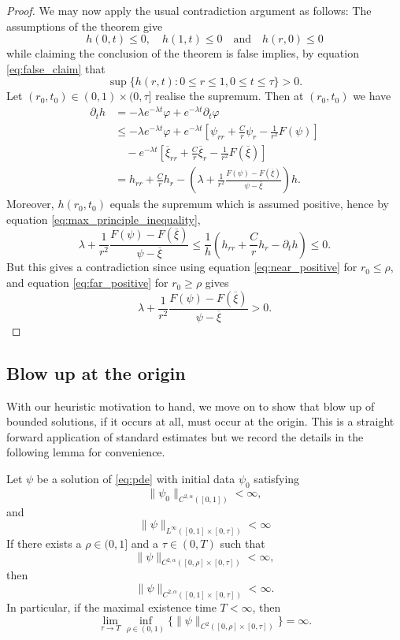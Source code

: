 \documentclass{amsart}
\begin{document}
\begin{proof}
We may now apply the usual contradiction argument as follows: The assumptions of the theorem give
\[
h(0, t) \leq 0, \quad h(1, t) \leq 0 \quad \text{and} \quad h(r, 0) \leq 0
\]
while claiming the conclusion of the theorem is false implies, by equation \eqref{eq:false_claim} that
\[
\sup \{h(r, t) : 0 \leq r \leq 1, 0 \leq t \leq \tau\} > 0.
\]
Let \((r_0, t_0) \in (0, 1) \times (0, \tau]\) realise the supremum. Then at \((r_0, t_0)\) we have
\begin{equation}
\label{eq:max_principle_inequality}
\begin{split}
\partial_t h &= - \lambda e^{-\lambda t} \varphi + e^{-\lambda t} \partial_t \varphi \\
&\leq  -\lambda e^{-\lambda t} \varphi + e^{-\lambda t} \left[\psi_{rr} + \frac{C}{r} \psi_r - \frac{1}{r^2} F(\psi)\right] \\
&\quad - e^{-\lambda t}\left[\overline{\xi}_{rr} + \frac{C}{r} \overline{\xi}_r - \frac{1}{r^2} F(\overline{\xi})\right] \\
&= h_{rr} + \frac{C}{r} h_r - \left(\lambda + \frac{1}{r^2} \frac{F(\psi) - F(\overline{\xi})}{\psi - \overline{\xi}}\right) h.
\end{split}
\end{equation}
Moreover, \(h(r_0, t_0)\) equals the supremum which is assumed positive, hence by equation \eqref{eq:max_principle_inequality},
\[
\lambda + \frac{1}{r^2} \frac{F(\psi) - F(\overline{\xi})}{\psi - \overline{\xi}} \leq \frac{1}{h} \left(h_{rr} + \frac{C}{r} h_r - \partial_t h\right) \leq 0.
\]
But this gives a contradiction since using equation \eqref{eq:near_positive} for \(r_0 \leq \rho\), and equation \eqref{eq:far_positive} for \(r_0 \geq \rho\) gives
\[
\lambda + \frac{1}{r^2} \frac{F(\psi) - F(\overline{\xi})}{\psi - \overline{\xi}} > 0.
\]
\end{proof}

\subsection{Blow up at the origin}
\label{subsec:origin_blowup}

With our heuristic motivation to hand, we move on to show that blow up of bounded solutions, if it occurs at all, must occur at the origin. This is a straight forward application of standard estimates \cite[Theorem 10.1]{Ladyzhenskaja:/1967} but we record the details in the following lemma for convenience.

\begin{lemma}
\label{lem:apriori_bounds}
Let \(\psi\) be a solution of \eqref{eq:pde} with initial data \(\psi_0\) satisfying
\[
\|\psi_0\|_{C^{2,\alpha}([0, 1])} < \infty,
\]
and
\[
\|\psi\|_{L^{\infty} ([0, 1] \times [0, \tau])} < \infty
\]
If there exists a \(\rho \in (0, 1]\) and a \(\tau \in (0, T)\) such that
\[
\|\psi\|_{C^{2,\alpha}([0, \rho] \times [0, \tau])} < \infty,
\]
then
\[
\|\psi\|_{C^{2,\alpha}([0, 1] \times [0, \tau])} < \infty.
\]
In particular, if the maximal existence time \(T < \infty\), then
\[
\lim_{\tau\to T} \inf_{\rho \in (0, 1)} \{\|\psi\|_{C^2([0, \rho] \times [0, \tau])}\} = \infty.
\]
\end{lemma}
\end{document}
